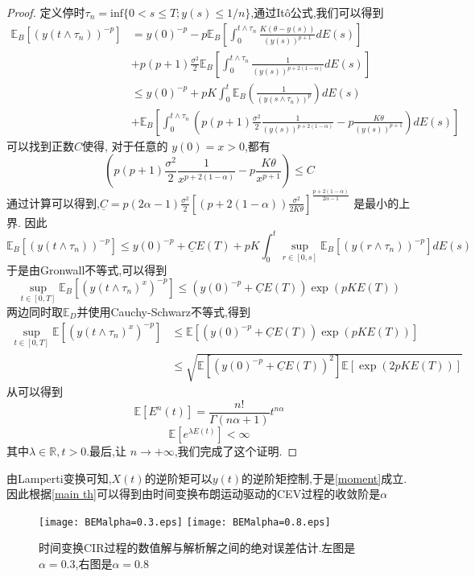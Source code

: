 \begin{proof}
	定义停时$\tau_{n}=\mathrm{inf}\{0<s\leq T;y(s)\leq1/n\}$,通过It\^{o}公式,我们可以得到
	$$\begin{aligned}
		\mathbb{E}_B\left[(y(t\wedge\tau_{n}))^{-p}\right] &=y(0)^{-p}-p\mathbb{E}_B\left[\int_{0}^{t\wedge\tau_{n}}\frac{K(\theta-y(s))}{(y(s))^{p+1}}dE(s)\right]\\
		&+p(p+1)\frac{\sigma^{2}}{2}\mathbb{E}_B\left[\int_{0}^{t\wedge\tau_{n}}\frac{1}{(y(s))^{p+2(1-\alpha)}}dE(s)\right] \\
		&\leq y(0)^{-p}+pK\int_{0}^{t}\mathbb{E}_B\left(\frac{1}{(y(s\wedge\tau_{n}))^{p}}
		\right)dE(s) \\
		&+\mathbb{E}_B\left[\int_0^{t\wedge\tau_n}\left(p(p+1)\frac{\sigma^2}{2}\frac{1}{(y(s))^{p+2(1-\alpha)}}-p\frac{K\theta}{(y(s))^{p+1}}\right)dE(s)\right]
	\end{aligned}$$
	可以找到正数$C$使得, 对于任意的 $y(0)=x>0$,都有
	$$\left(p(p+1)\frac{\sigma^2}{2}\frac{1}{x^{p+2(1-\alpha)}}-p\frac{K\theta}{x^{p+1}}\right)\leq C$$
	通过计算可以得到,$\underline C=p(2\alpha-1)\frac{\sigma^2}{2}\left[(p+2(1-\alpha))\frac{\sigma^2}{2K\theta}\right]^{\frac{p+2(1-\alpha)}{2\alpha-1}}$ 是最小的上界. 因此
	$$\mathbb{E}_B\left[(y(t\wedge\tau_n))^{-p}\right]\leq y(0)^{-p}+\underline{C}E(T)+pK\int_0^t\sup_{r\in[0,s]}\mathbb{E}_B\left[(y(r\wedge\tau_n))^{-p}\right]dE(s)$$
	于是由Gronwall不等式,可以得到
	$$\sup\limits_{t\in[0,T]}\mathbb{E}_B\left[(y(t\wedge\tau_n)^x)^{-p}\right]\leq\left(y(0)^{-p}+\underline{C}E(T)\right)\exp(pKE(T))$$
	两边同时取$\mathbb{E}_D$并使用Cauchy-Schwarz不等式,得到
	$$\begin{aligned}
		\sup\limits_{t\in[0,T]}\mathbb{E}\left[(y(t\wedge\tau_n)^x)^{-p}\right]&\leq\mathbb{E}\left[\left(y(0)^{-p}+\underline{C}E(T)\right)\exp(pKE(T))\right]\\
		&\leq\sqrt{\mathbb{E}\left[\left(y(0)^{-p}+\underline{C}E(T)\right)^2\right]\mathbb{E}\left[\exp(2pKE(T))\right]}
	\end{aligned}$$
	从\cite{jum2014strong}可以得到
	\begin{equation}
		\mathbb{E}[E^n(t)]=\frac{n!}{\Gamma(n\alpha+1)}t^{n\alpha}
	\end{equation}
	\begin{equation}
		\mathbb{E}[e^{\lambda E(t)}]<\infty
	\end{equation}
	其中$\lambda \in \mathbb{R},t>0$.最后,让 $n\to+\infty$,我们完成了这个证明.
\end{proof}


由Lamperti变换可知,$X(t)$的逆阶矩可以$y(t)$的逆阶矩控制,于是\cref{moment}成立.因此根据\cref{main th}可以得到由时间变换布朗运动驱动的CEV过程的收敛阶是$\alpha$
\

\begin{figure}[htp!]
	\centering
	\texttt{[image: BEMalpha=0.3.eps]}
	\hfill
	\texttt{[image: BEMalpha=0.8.eps]}
	\caption{时间变换CIR过程的数值解与解析解之间的绝对误差估计.左图是$\alpha=0.3$,右图是$\alpha=0.8$}
	\label{fig:image}
	\vspace{-2ex}
\end{figure}
